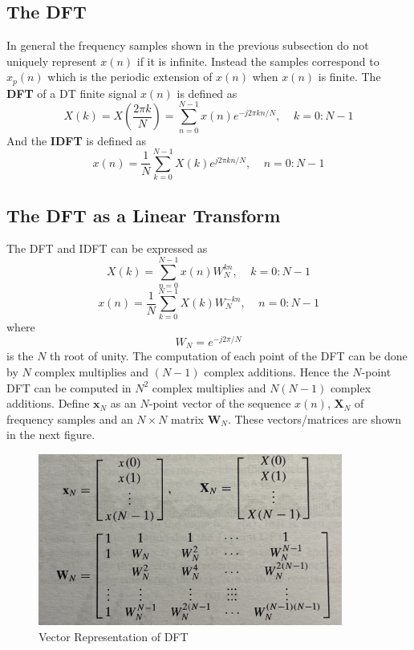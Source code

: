 \documentclass{article} %
\begin{document}
	\subsection{The DFT}
   In general the frequency samples shown in the previous subsection do not uniquely represent $x(n)$ if it is infinite. Instead the samples correspond to $x_p(n)$ which is the periodic extension of $x(n)$ when $x(n)$ is finite. The \textbf{DFT} of a DT finite signal $x(n)$ is defined as 
    \begin{equation}
	X(k) = X(\frac{2\pi k}{N}) = \sum_{n=0}^{N-1} x(n)e^{-j2\pi kn/N}, \;\;\;\; k = 0:N-1
	\end{equation}
	And the \textbf{IDFT} is defined as 
    \begin{equation}
	x(n) = \frac{1}{N}\sum_{k=0}^{N-1} X(k)e^{j2\pi kn/N}, \;\;\;\; n = 0:N-1
	\end{equation}
	
	\subsection{The DFT as a Linear Transform}
	The DFT and IDFT can be expressed as
	\begin{equation}
	X(k) = \sum_{n=0}^{N-1} x(n)W_N^{kn}, \;\;\;\; k = 0:N-1
	\end{equation}
    \begin{equation}
	x(n) = \frac{1}{N}\sum_{k=0}^{N-1} X(k)W_N^{-kn}, \;\;\;\; n = 0:N-1
	\end{equation}
	where
	\begin{equation}
	W_N = e^{-j2\pi /N}
	\end{equation}
	is the $N$ th root of unity. The computation of each point of the DFT can be done by $N$ complex multiplies and $(N-1)$ complex additions. Hence the $N$-point DFT can be computed in $N^2$ complex multiplies and $N(N-1)$ complex additions. Define $\textbf{x}_N$ as an $N$-point vector of the sequence $x(n)$, $\textbf{X}_N$ of frequency samples and an $N \times N$ matrix $\textbf{W}_N$. These vectors/matrices are shown in the next figure. 
  
	\begin{figure}[h]
	\centering
	\includegraphics[width=10cm]{roots_w}
	\caption{Vector Representation of DFT}
	\end{figure}
	
\end{document}
